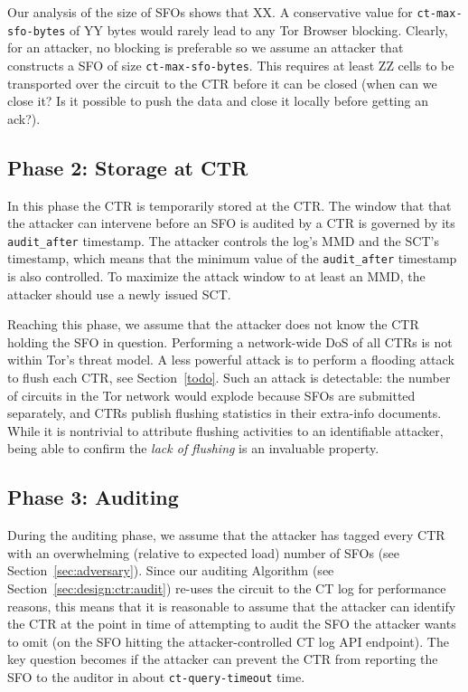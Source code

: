 Our analysis of the size of SFOs shows that XX. A conservative value for
\texttt{ct-max-sfo-bytes} of YY bytes would rarely lead to any Tor Browser
blocking. Clearly, for an attacker, no blocking is preferable so we assume an
attacker that constructs a SFO of size \texttt{ct-max-sfo-bytes}. This requires
at least ZZ cells to be transported over the circuit to the CTR before it can be
closed (when can we close it? Is it possible to push the data and close it
locally before getting an ack?).

\subsection{Phase 2: Storage at CTR} \label{sec:security:phase2}
In this phase the CTR is temporarily stored at the CTR. The window that that the
attacker can intervene before an SFO is audited by a CTR is governed by its
\texttt{audit\_after} timestamp.  The attacker controls the log's MMD and the
SCT's timestamp, which means that the minimum value of the \texttt{audit\_after}
timestamp is also controlled.  To maximize the attack window to at least an MMD,
the attacker should use a newly issued SCT.

Reaching this phase, we assume that the attacker does not know the CTR holding
the SFO in question. Performing a network-wide DoS of all CTRs is not within
Tor's threat model. A less powerful attack is to perform a flooding attack to
flush each CTR, see Section~\ref{todo}. Such an attack is detectable: the number
of circuits in the Tor network would explode because SFOs are submitted
separately, and CTRs publish flushing statistics in their extra-info documents.
While it is nontrivial to attribute flushing activities to an identifiable
attacker, being able to confirm the \emph{lack of flushing} is an invaluable
property.

\subsection{Phase 3: Auditing} \label{sec:security:phase3}
During the auditing phase, we assume that the attacker has tagged every CTR with
an overwhelming (relative to expected load) number of SFOs (see
Section~\ref{sec:adversary}). Since our auditing Algorithm (see
Section~\ref{sec:design:ctr:audit}) re-uses the circuit to the CT log for
performance reasons, this means that it is reasonable to assume that the
attacker can identify the CTR at the point in time of attempting to audit the
SFO the attacker wants to omit (on the SFO hitting the attacker-controlled CT
log API endpoint). The key question becomes if the attacker can prevent the CTR
from reporting the SFO to the auditor in about \texttt{ct-query-timeout} time.

